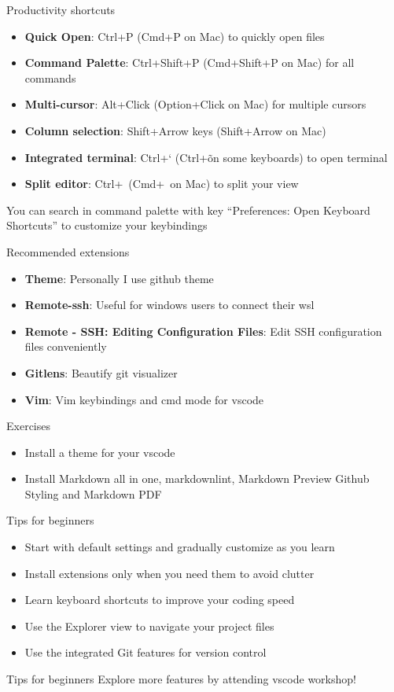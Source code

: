 \begin{frame}[fragile]{Productivity shortcuts}
	\begin{itemize}
		\item \textbf{Quick Open}: Ctrl+P (Cmd+P on Mac) to quickly open files
		\item \textbf{Command Palette}: Ctrl+Shift+P (Cmd+Shift+P on Mac) for all commands
		\item \textbf{Multi-cursor}: Alt+Click (Option+Click on Mac) for multiple cursors
		\item \textbf{Column selection}: Shift+Arrow keys (Shift+Arrow on Mac)
		\item \textbf{Integrated terminal}: Ctrl+` (Ctrl+\~ on some keyboards) to open terminal
		\item \textbf{Split editor}: Ctrl+\ (Cmd+\ on Mac) to split your view
	\end{itemize}

	You can search in command palette with key ``Preferences: Open Keyboard Shortcuts'' to customize your keybindings
\end{frame}

\begin{frame}[fragile]{Recommended extensions}
	\begin{itemize}
		\item \textbf{Theme}: Personally I use github theme
		\item \textbf{Remote-ssh}: Useful for windows users to connect their wsl
		\item \textbf{Remote - SSH: Editing Configuration Files}: Edit SSH configuration files conveniently
		\item \textbf{Gitlens}: Beautify git visualizer
		\item \textbf{Vim}: Vim keybindings and cmd mode for vscode
	\end{itemize}
\end{frame}

\begin{frame}[fragile]{Exercises}
	\begin{itemize}
		\item Install a theme for your vscode
		\item Install Markdown all in one, markdownlint, Markdown Preview Github Styling and Markdown PDF
	\end{itemize}
\end{frame}

\begin{frame}[fragile]{Tips for beginners}
	\begin{itemize}
		\item Start with default settings and gradually customize as you learn
		\item Install extensions only when you need them to avoid clutter
		\item Learn keyboard shortcuts to improve your coding speed
		\item Use the Explorer view to navigate your project files
		\item Use the integrated Git features for version control
	\end{itemize}
\end{frame}

\begin{frame}[fragile]{Tips for beginners}
	\huge Explore more features by attending vscode workshop!
\end{frame}
